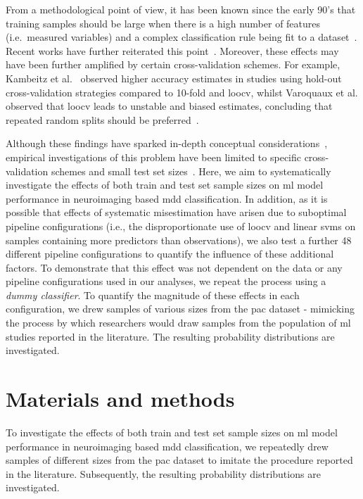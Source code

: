 \documentclass[12pt,a4paper]{article}
\begin{document}
    From a methodological point of view, it has been known since the early 90's that training samples should be large when there is a high number of features (i.e.\ measured variables) and a complex classification rule being fit to a dataset~\cite{Raudys1991}. Recent works have further reiterated this point~\cite{VanderPloeg2014}. Moreover, these effects may have been further amplified by certain cross-validation schemes. For example, Kambeitz et al.~\cite{Kambeitz2017} observed higher accuracy estimates in studies using hold-out cross-validation strategies compared to 10-fold and \ac{loocv}, whilst Varoquaux et al. observed that \ac{loocv} leads to unstable and biased estimates, concluding that repeated random splits should be preferred~\cite{Varoquaux2017}.

    Although these findings have sparked in-depth conceptual considerations~\cite{Hahn2019}, empirical investigations of this problem have been limited to specific cross-validation schemes and small test set sizes~\cite{Varoquaux2018}. Here, we aim to systematically investigate the effects of both train and test set sample sizes on \ac{ml} model performance in neuroimaging based \ac{mdd} classification. In addition, as it is possible that effects of systematic misestimation have arisen due to suboptimal pipeline configurations (i.e., the disproportionate use of \ac{loocv} and linear \acp{svm} on samples containing more predictors than observations), we also test a further \num{48} different pipeline configurations to quantify the influence of these additional factors. To demonstrate that this effect was not dependent on the data or any pipeline configurations used in our analyses, we repeat the process using a \emph{dummy classifier}. To quantify the magnitude of these effects in each configuration, we drew samples of various sizes from the \ac{pac} dataset - mimicking the process by which researchers would draw samples from the population of \ac{ml} studies reported in the literature. The resulting probability distributions are investigated.


    \section{Materials and methods}
    To investigate the effects of both train and test set sample sizes on \ac{ml} model performance in neuroimaging based \ac{mdd} classification, we repeatedly drew samples of different sizes from the \ac{pac} dataset to imitate the procedure reported in the literature. Subsequently, the resulting probability distributions are investigated.
\end{document}
